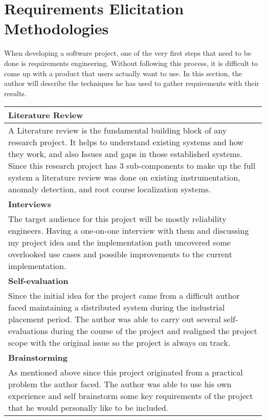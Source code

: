 \section{Requirements Elicitation Methodologies}

When developing a software project, one of the very first steps that need to be done is requirements engineering. Without following this process, it is difficult to come up with a product that users actually want to use. In this section, the author will describe the techniques he has used to gather requirements with their results.

\begin{longtable}{|p{160mm}|}
\hline
\textbf{Literature Review} \\ \hline
A Literature review is the fundamental building block of any research project. It helps to understand existing systems and how they work, and also Issues and gaps in those established systems. Since this research project has 3 sub-components to make up the full system a literature review was done on existing instrumentation, anomaly detection, and root course localization systems. \\ \hline

\textbf{Interviews} \\ \hline
The target audience for this project will be mostly reliability engineers. Having a one-on-one interview with them and discussing my project idea and the implementation path uncovered some overlooked use cases and possible improvements to the current implementation. \\ \hline


\textbf{Self-evaluation} \\ \hline
Since the initial idea for the project came from a difficult author faced maintaining a distributed system during the industrial placement period. The author was able to carry out several self-evaluations during the course of the project and realigned the project scope with the original issue so the project is always on track. \\ \hline

\textbf{Brainstorming} \\ \hline
As mentioned above since this project originated from a practical problem the author faced. The author was able to use his own experience and self brainstorm some key requirements of the project that he would personally like to be included. \\ \hline


\end{longtable}

